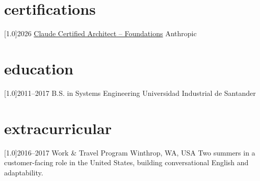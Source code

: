 \documentclass[english]{cv-style}     %
\begin{document}
\section{certifications}
  \vspace{-0.2cm}
\begin{entrylist}
\entry
{\scalebox{.8}[1.0]{2026}}
{\href{https://www.credly.com/badges/07c08f2a-ce0d-4392-bf0b-da6e9246d14d}{Claude Certified Architect -- Foundations}}
{Anthropic}
{}
\end{entrylist}

\section{education}
  \vspace{-0.2cm}
\begin{entrylist}
\entry
{\scalebox{.8}[1.0]{2011--2017}}
{B.S. in Systems Engineering}
{Universidad Industrial de Santander}
{}
\end{entrylist}

\section{extracurricular}
  \vspace{-0.2cm}
\begin{entrylist}
\entry
{\scalebox{.8}[1.0]{2016--2017}}
{Work \& Travel Program}
{Winthrop, WA, USA}
{Two summers in a customer-facing role in the United States, building conversational English and adaptability.}
\end{entrylist}
\end{document}
